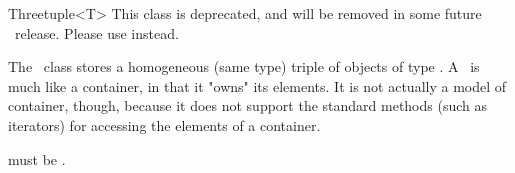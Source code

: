 \begin{ccRefClass}{Threetuple<T>}
  This class is deprecated, and will be removed in some future \cgal\ release.
  Please use  instead.
  
  \begin{ccDeprecated}
  \ccDefinition The \ccRefName\ class stores a homogeneous (same type) triple
  of objects of type .  A \ccRefName\ is much like a container, in that
  it "owns" its elements. It is not actually a model of container, though,
  because it does not support the standard methods (such as iterators) for
  accessing the elements of a container.

  
  \ccRequirements {} must be .


  \ccTypes

  \ccGlue
  \ccGlue

  \ccCreation
  
  
  \end{ccDeprecated}
\end{ccRefClass}



